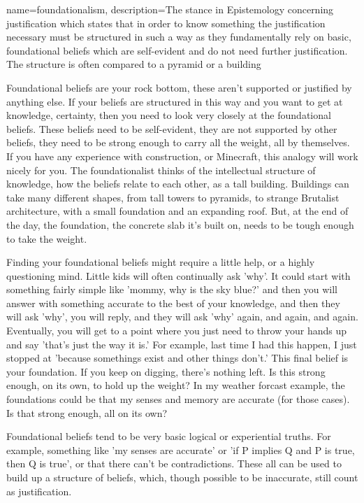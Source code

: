 {
name=foundationalism,
description={The stance in Epistemology concerning justification which states that in order to know something the justification necessary must be structured in such a way as they fundamentally rely on basic, foundational beliefs which are self-evident and do not need further justification. The structure is often compared to a pyramid or a building}
}


Foundational beliefs are your rock bottom, these aren't supported or justified by anything else. If your beliefs are structured in this way and you want to get at knowledge, certainty, then you need to look very closely at the foundational beliefs. These beliefs need to be self-evident, they are not  supported by other beliefs, they need to be strong enough to carry all the weight, all by themselves.  If you have any experience with construction, or Minecraft, this analogy will work nicely for you. The foundationalist thinks of the intellectual structure of knowledge, how the beliefs relate to each other, as a tall building. Buildings can take many different shapes, from tall towers to pyramids, to strange Brutalist architecture, with a small foundation and an expanding roof. But, at the end of the day, the foundation, the concrete slab it's built on, needs to be tough enough to take the weight. 

Finding your foundational beliefs might require a little help, or a highly questioning mind. Little kids will often continually ask 'why'. It could start with something fairly simple like 'mommy, why is the sky blue?' and then you will answer with something accurate to the best of your knowledge, and then they will ask 'why', you will reply, and they will ask 'why' again, and again, and again. Eventually, you will get to a point where you just need to throw your hands up and say 'that's just the way it is.' For example, last time I had this happen, I just stopped at 'because somethings exist and other things don't.' This final belief is your foundation. If you keep on digging, there's nothing left. Is this strong enough, on its own, to hold up the weight? In my weather forcast example, the foundations could be that my senses and memory are accurate (for those cases). Is that strong enough, all on its own? 

Foundational beliefs tend to be very basic logical or experiential truths. For example, something like 'my senses are accurate' or 'if P implies Q and P is true, then Q is true', or that there can't be contradictions. These all can be used to build up a structure of beliefs, which, though possible to be inaccurate, still count as justification.

